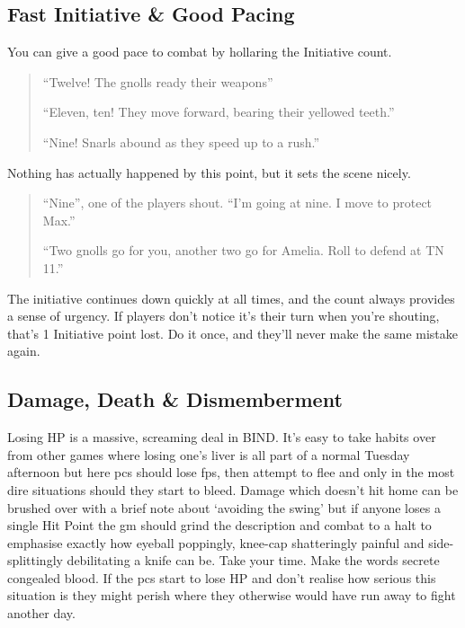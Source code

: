 \begin{multicols}{2}

\subsection{Fast Initiative \& Good Pacing}

You can give a good pace to combat by hollaring the Initiative count.

\begin{quote}

``Twelve! The gnolls ready their weapons''

``Eleven, ten! They move forward, bearing their yellowed teeth.''

``Nine! Snarls abound as they speed up to a rush.''

\end{quote}

Nothing has actually happened by this point, but it sets the scene nicely.

\begin{quote}

``Nine'', one of the players shout.  ``I'm going at nine.  I move to protect Max.''

``Two gnolls go for you, another two go for Amelia.  Roll to defend at TN 11.''

\end{quote}

The initiative continues down quickly at all times, and the count always provides a sense of urgency.
If players don't notice it's their turn when you're shouting, that's 1 Initiative point lost.
Do it once, and they'll never make the same mistake again.

\subsection{Damage, Death \& Dismemberment}

Losing HP is a massive, screaming deal in BIND.
It's easy to take habits over from other games where losing one's liver is all part of a normal Tuesday afternoon but here \glspl{pc} should lose \glspl{fp}, then attempt to flee and only in the most dire situations should they start to bleed.
Damage which doesn't hit home can be brushed over with a brief note about `avoiding the swing' but if anyone loses a single Hit Point the \gls{gm} should grind the description and combat to a halt to emphasise exactly how eyeball poppingly, knee-cap shatteringly painful and side-splittingly debilitating a knife can be.
Take your time.
Make the words secrete congealed blood.
If the \glspl{pc} start to lose HP and don't realise how serious this situation is they might perish where they otherwise would have run away to fight another day.


\end{multicols}
